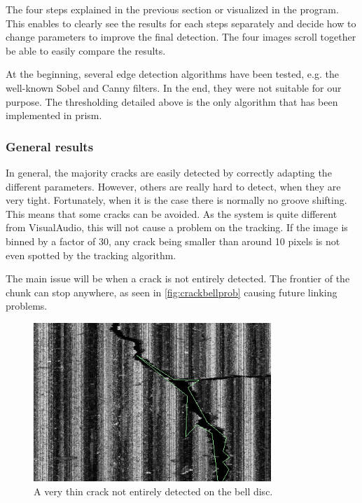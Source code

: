 The four steps explained in the previous section or visualized in the program. This enables to clearly see the results for each steps separately and decide how to change parameters to improve the final detection. The four images scroll together be able to easily compare the results.

At the beginning, several edge detection algorithms have been tested, e.g. the well-known Sobel and Canny filters. In the end, they were not suitable for our purpose. The thresholding detailed above is the only algorithm that has been implemented in \gls{prism}.

\subsubsection{General results}

In general, the majority cracks are easily detected by correctly adapting the different parameters. However, others are really hard to detect, when they are very tight. Fortunately, when it is the case there is normally no groove shifting. This means that some cracks can be avoided. As the system is quite different from VisualAudio, this will not cause a problem on the tracking. If the image is binned by a factor of 30, any crack being smaller than around 10 pixels is not even spotted by the tracking algorithm.

The main issue will be when a crack is not entirely detected. The frontier of the chunk can stop anywhere, as seen in \autoref{fig:crackbellprob} causing future linking problems.

\begin{figure}[!ht]
\centering
\includegraphics[width=0.8\textwidth]{images/crack-bell-prob}
\caption{A very thin crack not entirely detected on the bell disc.}
\label{fig:crackbellprob}
\end{figure}

